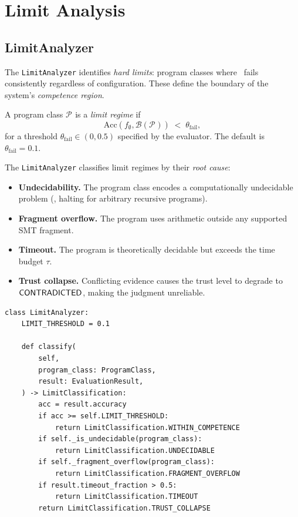 \documentclass[11pt]{article}
\newcommand{\Acc}{\mathrm{Acc}}             %
\newcommand{\PClass}[1]{\mathcal{P}_{#1}}   %
\newcommand{\Threshold}{\theta}             %
\begin{document}
\section{Limit Analysis}
\label{sec:limits}

\subsection{LimitAnalyzer}
\label{subsec:limit-analyzer}

The \texttt{LimitAnalyzer} identifies \emph{hard limits}: program
classes where \JuGeo\ fails consistently regardless of configuration.
These define the boundary of the system's \emph{competence region}.

\begin{definition}
\label{def:limit-regime}
A program class $\PClass{}$ is a \emph{limit regime} if
\[
  \Acc(f_\emptyset, \mathcal{B}(\PClass{})) \;<\; \Threshold_{\mathrm{fail}},
\]
for a threshold $\Threshold_{\mathrm{fail}} \in (0, 0.5)$ specified by
the evaluator.  The default is $\Threshold_{\mathrm{fail}} = 0.1$.
\end{definition}

The \texttt{LimitAnalyzer} classifies limit regimes by their
\emph{root cause}:
\begin{itemize}
\item \textbf{Undecidability.}  The program class encodes a
  computationally undecidable problem (\eg, halting for arbitrary
  recursive programs).
\item \textbf{Fragment overflow.}  The program uses arithmetic outside
  any supported SMT fragment.
\item \textbf{Timeout.}  The program is theoretically decidable but
  exceeds the time budget $\tau$.
\item \textbf{Trust collapse.}  Conflicting evidence causes the trust
  level to degrade to $\mathsf{CONTRADICTED}$, making the judgment unreliable.
\end{itemize}

\begin{lstlisting}[style=jugeo-python,caption={LimitAnalyzer.classify (complexity\_analysis.py)}]
class LimitAnalyzer:
    LIMIT_THRESHOLD = 0.1

    def classify(
        self,
        program_class: ProgramClass,
        result: EvaluationResult,
    ) -> LimitClassification:
        acc = result.accuracy
        if acc >= self.LIMIT_THRESHOLD:
            return LimitClassification.WITHIN_COMPETENCE
        if self._is_undecidable(program_class):
            return LimitClassification.UNDECIDABLE
        if self._fragment_overflow(program_class):
            return LimitClassification.FRAGMENT_OVERFLOW
        if result.timeout_fraction > 0.5:
            return LimitClassification.TIMEOUT
        return LimitClassification.TRUST_COLLAPSE
\end{lstlisting}
\end{document}
